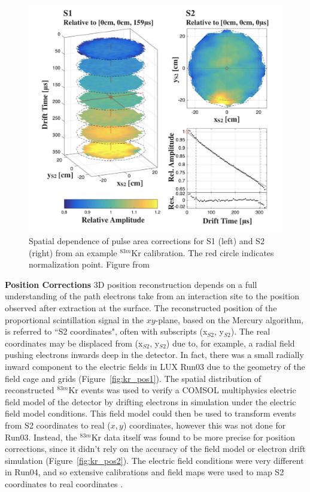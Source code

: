\begin{figure}[htbp]
\begin{center}
\includegraphics[width=\textwidth]{figures/lux/kr_1.png}
\caption{ Spatial dependence of pulse area corrections for S1 (left) and S2 (right) from an example $^{83m}$Kr calibration. The red circle indicates normalization point. Figure from \cite{LUXKr}}
\label{fig:kr_1}
\end{center}
\end{figure}

\textbf{Position Corrections} 3D position reconstruction depends on a full understanding of the path electrons take from an interaction site to the position observed after extraction at the surface. The reconstructed position of the proportional scintillation signal in the $xy$-plane, based on the Mercury algorithm, is referred to ``S2 coordinates", often with subscripts (x$_{S2}$, y$_{S2}$). The real coordinates may be displaced from (x$_{S2}$, y$_{S2}$) due to, for example, a radial field pushing electrons inwards deep in the detector. In fact, there was a small radially inward component to the electric fields in \ac{LUX} Run03 due to the geometry of the field cage and grids (Figure~\ref{fig:kr_pos1}). The spatial distribution of reconstructed $^{83m}$Kr events was used to verify a COMSOL multiphysics electric field model of the detector by drifting electrons in simulation under the electric field model conditions. This field model could then be used to transform events from S2 coordinates to real ($x,y$) coordinates, however this was not done for Run03. Instead, the $^{83m}$Kr data itself was found to be more precise for position corrections, since it didn't rely on the accuracy of the field model or electron drift simulation (Figure~\ref{fig:kr_pos2}). The electric field conditions were very different in Run04, and so extensive calibrations and field maps were used to map S2 coordinates to real coordinates \cite{LUXFields}.

